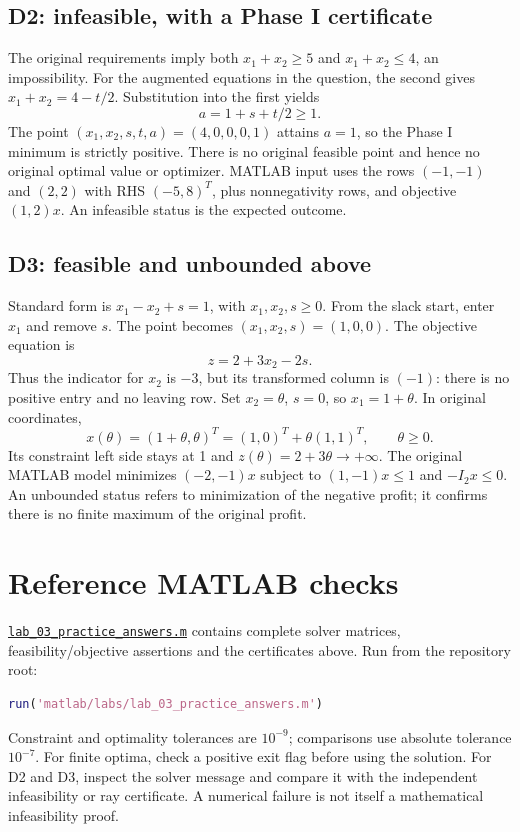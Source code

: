 \documentclass[11pt,a4paper]{article}
\begin{document}
\subsection{D2: infeasible, with a Phase I certificate}
The original requirements imply both $x_1+x_2\geq5$ and $x_1+x_2\leq4$,
an impossibility. For the augmented equations in the question,
the second gives $x_1+x_2=4-t/2$. Substitution into the first yields
\[
  a=1+s+t/2\geq1.
\]
The point $(x_1,x_2,s,t,a)=(4,0,0,0,1)$ attains $a=1$, so the Phase I
minimum is strictly positive. There is no original feasible point and hence
no original optimal value or optimizer. MATLAB input uses the rows
$(-1,-1)$ and $(2,2)$ with RHS $(-5,8)^T$, plus nonnegativity rows,
and objective $(1,2)x$. An infeasible status is the expected outcome.

\subsection{D3: feasible and unbounded above}
Standard form is $x_1-x_2+s=1$, with $x_1,x_2,s\geq0$. From the slack
start, enter $x_1$ and remove $s$. The point becomes $(x_1,x_2,s)=(1,0,0)$.
The objective equation is
\[
  z=2+3x_2-2s.
\]
Thus the indicator for $x_2$ is $-3$, but its transformed column is $(-1)$:
there is no positive entry and no leaving row. Set $x_2=\theta$, $s=0$,
so $x_1=1+\theta$. In original coordinates,
\[
  x(\theta)=(1+\theta,\theta)^T=(1,0)^T+\theta(1,1)^T,\qquad\theta\geq0.
\]
Its constraint left side stays at 1 and $z(\theta)=2+3\theta\to+\infty$.
The original MATLAB model minimizes $(-2,-1)x$ subject to $(1,-1)x\leq1$
and $-I_2x\leq0$. An unbounded status refers to minimization of the negative
profit; it confirms there is no finite maximum of the original profit.

\section{Reference MATLAB checks}
\href{run:matlab/labs/lab_03_practice_answers.m}{\texttt{lab\_03\_practice\_answers.m}}
contains complete solver matrices, feasibility/objective assertions and the
certificates above. Run from the repository root:
\begin{lstlisting}[language=Matlab]
run('matlab/labs/lab_03_practice_answers.m')
\end{lstlisting}
Constraint and optimality tolerances are $10^{-9}$; comparisons use absolute
tolerance $10^{-7}$. For finite optima, check a positive exit flag before using
the solution. For D2 and D3, inspect the solver message and compare it with the
independent infeasibility or ray certificate. A numerical failure is not itself
a mathematical infeasibility proof.
\end{document}
